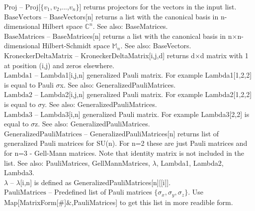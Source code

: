 \noindent\textbf{$ \text{Proj} $ }-- Proj[$\{$$ v_1,v_2 $,...,$ v_n $$\}$] returns projectors for the vectors in the input list.$  $\\

\noindent\textbf{$ \text{BaseVectors} $ }-- BaseVectors[n] returns a list with the canonical basis in n-dimensional Hilbert space $ \mathbb{C}^n $. See also: BaseMatrices.$  $\\

\noindent\textbf{$ \text{BaseMatrices} $ }-- BaseMatrices[n] returns a list with the canonical basis in n$\times $n-dimensional Hilbert-Schmidt space $ \mathbb{M}_n $. See also: BaseVectors.$  $\\

\noindent\textbf{$ \text{KroneckerDeltaMatrix} $ }-- KroneckerDeltaMatrix[i,j,d] returns d$\times $d matrix with 1 at position (i,j) and zeros elsewhere.$  $\\

\noindent\textbf{$ \text{Lambda1} $ }-- Lambda1[i,j,n] generalized Pauli matrix. For example Lambda1[1,2,2] is equal to Pauli $\sigma $x. See also: GeneralizedPauliMatrices.$  $\\

\noindent\textbf{$ \text{Lambda2} $ }-- Lambda2[i,j,n] generalized Pauli matrix. For example Lambda2[1,2,2] is equal to $\sigma $y. See also: GeneralizedPauliMatrices.$  $\\

\noindent\textbf{$ \text{Lambda3} $ }-- Lambda3[i,n] generalized Pauli matrix. For example Lambda3[2,2] is equal to $\sigma $z. See also: GeneralizedPauliMatrices.$  $\\

\noindent\textbf{$ \text{GeneralizedPauliMatrices} $ }-- GeneralizedPauliMatrices[n] returns list of generalized Pauli matrices for SU(n). For n=2 these are just Pauli matrices and for n=3 - Gell-Mann matrices. Note that identity matrix is not included in the list. See also: PauliMatrices, GellMannMatrices, $\lambda $, Lambda1, Lambda2, Lambda3.$  $\\

\noindent\textbf{$ \lambda  $ }-- $\lambda $[i,n] is defined as GeneralizedPauliMatrices[n][[i]].$  $\\

\noindent\textbf{$ \text{PauliMatrices} $ }-- Predefined list of Pauli matrices $\{$$ \sigma _x,\sigma _y,\sigma _z $$\}$. Use Map[MatrixForm[$\#$]$\&$,PauliMatrices] to get this list in more readible form.$  $\\

